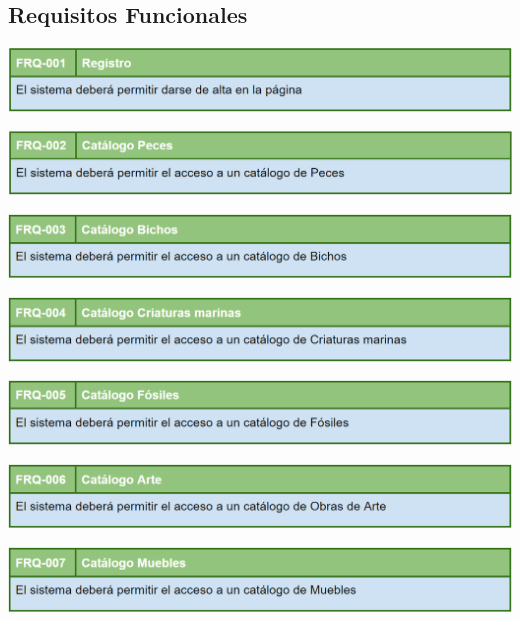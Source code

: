 	\subsection{Requisitos Funcionales}
	
	\bigskip
	
	\includegraphics[width=\textwidth]{img/cap5/FR/1.png}
	
	\bigskip
	
	\includegraphics[width=\textwidth]{img/cap5/FR/2.png}
	
	\bigskip
	
	\includegraphics[width=\textwidth]{img/cap5/FR/3.png}
	
	\bigskip
	
	\includegraphics[width=\textwidth]{img/cap5/FR/4.png}
	
	\bigskip
	
	\includegraphics[width=\textwidth]{img/cap5/FR/5.png}
	
	\bigskip
	
	\includegraphics[width=\textwidth]{img/cap5/FR/6.png}
	
	\bigskip
	
	\includegraphics[width=\textwidth]{img/cap5/FR/7.png}
	
